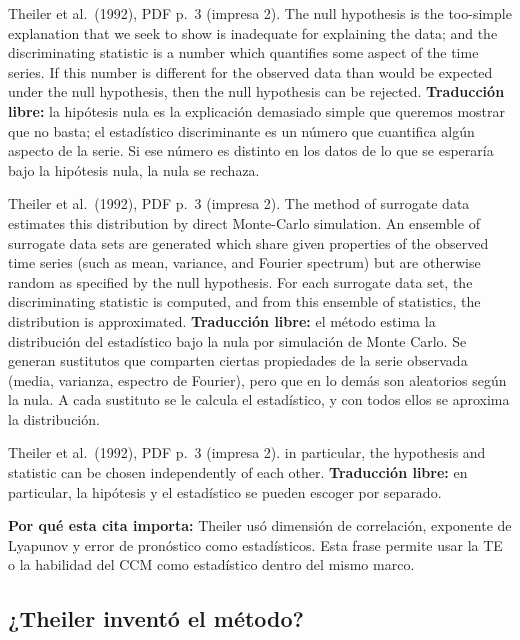 \documentclass[11pt,openany]{book}
\begin{document}
\begin{cita}{Theiler et al.\ (1992), PDF p.~3 (impresa 2).}
The null hypothesis is the too-simple explanation that we seek to show is inadequate for explaining the data; and the discriminating statistic is a number which quantifies some aspect of the time series. If this number is different for the observed data than would be expected under the null hypothesis, then the null hypothesis can be rejected.
\tcblower
\textbf{Traducción libre:} la hipótesis nula es la explicación demasiado simple que queremos mostrar que no basta; el estadístico discriminante es un número que cuantifica algún aspecto de la serie. Si ese número es distinto en los datos de lo que se esperaría bajo la hipótesis nula, la nula se rechaza.
\end{cita}

\begin{cita}{Theiler et al.\ (1992), PDF p.~3 (impresa 2).}
The method of surrogate data estimates this distribution by direct Monte-Carlo simulation. An ensemble of surrogate data sets are generated which share given properties of the observed time series (such as mean, variance, and Fourier spectrum) but are otherwise random as specified by the null hypothesis. For each surrogate data set, the discriminating statistic is computed, and from this ensemble of statistics, the distribution is approximated.
\tcblower
\textbf{Traducción libre:} el método estima la distribución del estadístico bajo la nula por simulación de Monte Carlo. Se generan sustitutos que comparten ciertas propiedades de la serie observada (media, varianza, espectro de Fourier), pero que en lo demás son aleatorios según la nula. A cada sustituto se le calcula el estadístico, y con todos ellos se aproxima la distribución.
\end{cita}

\begin{cita}{Theiler et al.\ (1992), PDF p.~3 (impresa 2).}
in particular, the hypothesis and statistic can be chosen independently of each other.
\tcblower
\textbf{Traducción libre:} en particular, la hipótesis y el estadístico se pueden escoger por separado.
\end{cita}

\textbf{Por qué esta cita importa:} Theiler usó dimensión de correlación, exponente de Lyapunov y error de pronóstico como estadísticos. Esta frase permite usar la TE o la habilidad del CCM como estadístico dentro del mismo marco.

\subsection*{¿Theiler inventó el método?}
\end{document}
